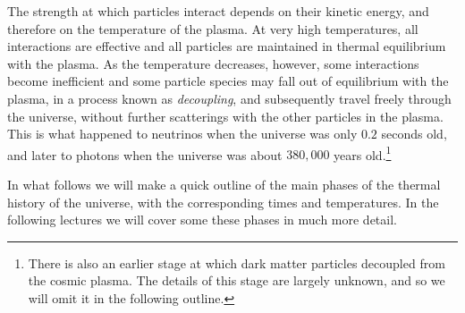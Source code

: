\documentclass[11pt, a4paper,oneside,openright]{book}
\numberwithin{equation}{section}
\begin{document}
The strength at which particles interact depends on their kinetic energy, and therefore on the temperature of the plasma. At very high temperatures, all interactions are effective and all particles are maintained in thermal equilibrium with the plasma. As the temperature decreases, however, some interactions become inefficient and some particle species may fall out of equilibrium with the plasma, in a process known as {\it decoupling}, and subsequently travel freely through the universe, without further scatterings with the other particles in the plasma. This is what happened to neutrinos when the universe was only $0.2$ seconds old, and later to photons when the universe was about $380,000$ years old.\footnote{There is also an earlier stage at which dark matter particles decoupled from the cosmic plasma. The details of this stage are largely unknown, and so we will omit it in the following outline.}

In what follows we will make a quick outline of the main phases of the thermal history of the universe, with the corresponding times and temperatures. In the following lectures we will cover some these phases in much more detail.
\end{document}
